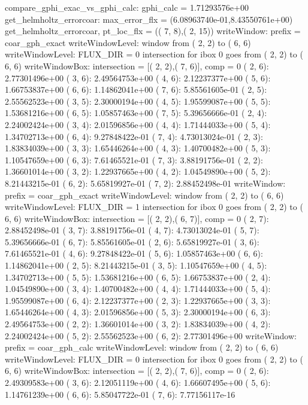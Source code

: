 \begin{itemize}
compare_gphi_exac_vs_gphi_calc: gphi_calc = 1.71293576e+00
get_helmholtz_errorcoar: max_error_flx = (6.08963740e-01,8.43550761e+00)
get_helmholtz_errorcoar, pt_loc_flx    = ((  7,  8),(  2, 15))
writeWindow: prefix = coar_gph_exact     
writeWindowLevel:  window from (  2,  2) to (  6,  6)
writeWindowLevel: FLUX_DIR = 0
 intersection for ibox  0 goes from (  2,  2) to (  6,  6)
writeWindowBox: intersection = [(  2,  2),(  7,  6)], comp = 0
(  2,  6): 2.77301496e+00  (  3,  6): 2.49564753e+00  (  4,  6): 2.12237377e+00  (  5,  6): 1.66753837e+00  (  6,  6): 1.14862041e+00  (  7,  6): 5.85561605e-01  
(  2,  5): 2.55562523e+00  (  3,  5): 2.30000194e+00  (  4,  5): 1.95599087e+00  (  5,  5): 1.53681216e+00  (  6,  5): 1.05857463e+00  (  7,  5): 5.39656666e-01  
(  2,  4): 2.24002424e+00  (  3,  4): 2.01596856e+00  (  4,  4): 1.71444033e+00  (  5,  4): 1.34702713e+00  (  6,  4): 9.27848422e-01  (  7,  4): 4.73013024e-01  
(  2,  3): 1.83834039e+00  (  3,  3): 1.65446264e+00  (  4,  3): 1.40700482e+00  (  5,  3): 1.10547659e+00  (  6,  3): 7.61465521e-01  (  7,  3): 3.88191756e-01  
(  2,  2): 1.36601014e+00  (  3,  2): 1.22937665e+00  (  4,  2): 1.04549890e+00  (  5,  2): 8.21443215e-01  (  6,  2): 5.65819927e-01  (  7,  2): 2.88452498e-01  
writeWindow: prefix = coar_gph_exact     
writeWindowLevel:  window from (  2,  2) to (  6,  6)
writeWindowLevel: FLUX_DIR = 1
 intersection for ibox  0 goes from (  2,  2) to (  6,  6)
writeWindowBox: intersection = [(  2,  2),(  6,  7)], comp = 0
(  2,  7): 2.88452498e-01  (  3,  7): 3.88191756e-01  (  4,  7): 4.73013024e-01  (  5,  7): 5.39656666e-01  (  6,  7): 5.85561605e-01  
(  2,  6): 5.65819927e-01  (  3,  6): 7.61465521e-01  (  4,  6): 9.27848422e-01  (  5,  6): 1.05857463e+00  (  6,  6): 1.14862041e+00  
(  2,  5): 8.21443215e-01  (  3,  5): 1.10547659e+00  (  4,  5): 1.34702713e+00  (  5,  5): 1.53681216e+00  (  6,  5): 1.66753837e+00  
(  2,  4): 1.04549890e+00  (  3,  4): 1.40700482e+00  (  4,  4): 1.71444033e+00  (  5,  4): 1.95599087e+00  (  6,  4): 2.12237377e+00  
(  2,  3): 1.22937665e+00  (  3,  3): 1.65446264e+00  (  4,  3): 2.01596856e+00  (  5,  3): 2.30000194e+00  (  6,  3): 2.49564753e+00  
(  2,  2): 1.36601014e+00  (  3,  2): 1.83834039e+00  (  4,  2): 2.24002424e+00  (  5,  2): 2.55562523e+00  (  6,  2): 2.77301496e+00  
writeWindow: prefix = coar_gph_calc      
writeWindowLevel:  window from (  2,  2) to (  6,  6)
writeWindowLevel: FLUX_DIR = 0
 intersection for ibox  0 goes from (  2,  2) to (  6,  6)
writeWindowBox: intersection = [(  2,  2),(  7,  6)], comp = 0
(  2,  6): 2.49309583e+00  (  3,  6): 2.12051119e+00  (  4,  6): 1.66607495e+00  (  5,  6): 1.14761239e+00  (  6,  6): 5.85047722e-01  (  7,  6): 7.77156117e-16  

\end{itemize}
